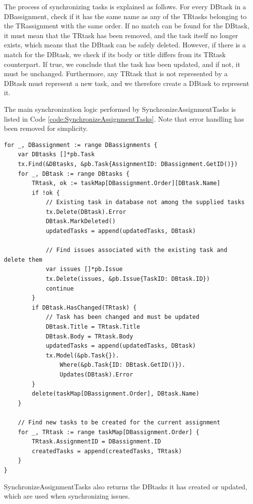 The process of synchronizing tasks is explained as follows.
For every DBtask in a DBassignment, check if it has the same name as any of the TRtasks belonging to the TRassignment with the same order.
If no match can be found for the DBtask, it must mean that the TRtask has been removed, and the task itself no longer exists, which means that
the DBtask can be safely deleted.
However, if there is a match for the DBtask, we check if its body or title differs from its TRtask counterpart.
If true, we conclude that the task has been updated, and if not, it must be unchanged.
Furthermore, any TRtask that is not represented by a DBtask must represent a new task, and we therefore create a DBtask to represent it.

The main synchronization logic performed by SynchronizeAssignmentTasks is listed in Code \ref{code:SynchronizeAssignmentTasks}.
Note that error handling has been removed for simplicity.

\begin{lstlisting}[caption={Task synchronization performed by SynchronizeAssignmentTasks}, 
                            language=Golang, label={code:SynchronizeAssignmentTasks},
                            commentstyle={\slshape}]
for _, DBassignment := range DBassignments {
	var DBtasks []*pb.Task
	tx.Find(&DBtasks, &pb.Task{AssignmentID: DBassignment.GetID()})
	for _, DBtask := range DBtasks {
		TRtask, ok := taskMap[DBassignment.Order][DBtask.Name]
		if !ok {
			// Existing task in database not among the supplied tasks
			tx.Delete(DBtask).Error
			DBtask.MarkDeleted()
			updatedTasks = append(updatedTasks, DBtask)
			
			// Find issues associated with the existing task and delete them
			var issues []*pb.Issue
			tx.Delete(issues, &pb.Issue{TaskID: DBtask.ID})
			continue
		}
		if DBtask.HasChanged(TRtask) {
			// Task has been changed and must be updated
			DBtask.Title = TRtask.Title
			DBtask.Body = TRtask.Body
			updatedTasks = append(updatedTasks, DBtask)
			tx.Model(&pb.Task{}).
				Where(&pb.Task{ID: DBtask.GetID()}).
				Updates(DBtask).Error
		}
		delete(taskMap[DBassignment.Order], DBtask.Name)
	}

	// Find new tasks to be created for the current assignment
	for _, TRtask := range taskMap[DBassignment.Order] {
		TRtask.AssignmentID = DBassignment.ID
		createdTasks = append(createdTasks, TRtask)
	}
}
\end{lstlisting}

SynchronizeAssignmentTasks also returns the DBtasks it has created or updated, which are used when synchronizing issues.

